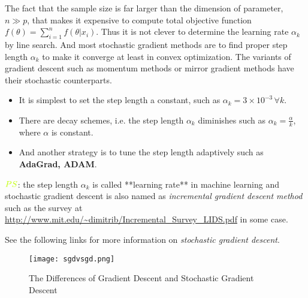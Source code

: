 \documentclass[titlestyle=hang,11pt]{elegantbook}
\begin{document}
The fact that the sample size is far larger than the dimension of parameter, $n\gg p$,
that makes it expensive to compute total objective function $f(\theta)=\sum_{i=1}^{n}f(\theta|{x}_i)$.
Thus it is not clever to determine the learning rate $\alpha_k$ by line search.
And most stochastic gradient methods are to find  proper step length $\alpha_{k}$ to make it converge at least in convex optimization.
The variants of gradient descent such as momentum methods or mirror gradient methods have their stochastic counterparts.
\begin{itemize}
\item It is simplest to set the step length a constant, such as ${\alpha}_k=3\times 10^{-3}\, \forall k$.
\item There are decay schemes, i.e. the step length ${\alpha}_k$ diminishes such as ${\alpha}_k=\frac{\alpha}{k}$, where $\alpha$ is constant.
\item And another strategy is to tune the step length adaptively such as \textbf{AdaGrad, ADAM}.
\end{itemize}

$\color{lime}{PS}$: the step length  $\alpha_k$ is called **learning rate** in machine learning and
stochastic gradient descent is also named as \emph{incremental gradient descent method} such as the survey at \url{http://www.mit.edu/~dimitrib/Incremental_Survey_LIDS.pdf} in some case.

See the following links for more information on \emph{stochastic gradient descent}.


\begin{figure}[!htbp]
	\centering
	\texttt{[image: sgdvsgd.png]}
	\caption{The Differences of Gradient Descent and Stochastic Gradient Descent\label{fig:sgd vs gd}}
\end{figure}
\end{document}
